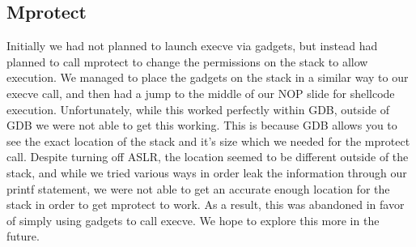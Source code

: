 \subsection{Mprotect}
Initially we had not planned to launch execve via gadgets, but instead had planned to call mprotect to change the permissions on the stack to allow execution. We managed to place the gadgets on the stack in a similar way to our execve call, and then had a jump to the middle of our NOP slide for shellcode execution. Unfortunately, while this worked perfectly within GDB, outside of GDB we were not able to get this working. This is because GDB allows you to see the exact location of the stack and it's size which we needed for the mprotect call. Despite turning off ASLR, the location seemed to be different outside of the stack, and while we tried various ways in order leak the information through our printf statement, we were not able to get an accurate enough location for the stack in order to get mprotect to work. As a result, this was abandoned in favor of simply using gadgets to call execve. We hope to explore this more in the future. 



